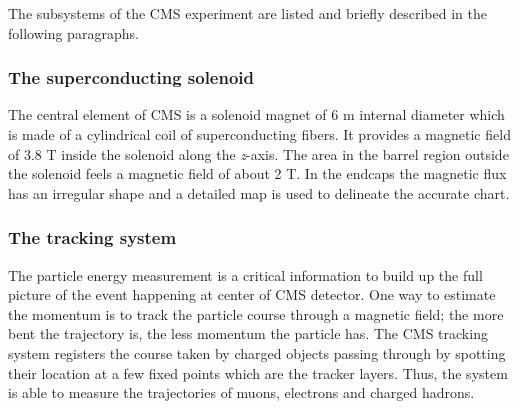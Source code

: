 The subsystems of the CMS experiment are listed and briefly described
in the following paragraphs.

\subsubsection{The superconducting solenoid}
The central element of CMS is a solenoid magnet of 6 m internal diameter
which is made of a cylindrical coil of superconducting fibers. It 
provides a magnetic field of 3.8 T inside the solenoid along the
\emph{z}-axis. The area in the barrel region outside the solenoid
feels a magnetic field of about 2 T.
In the endcaps the
magnetic flux has an irregular shape and a detailed map is used to
delineate the accurate chart.
\subsubsection{The tracking system}\label{sec:tracking}
The particle energy measurement is a critical information to build up the full
picture of the event happening at center of CMS detector. One way to
estimate the momentum is to track the particle course through a
magnetic field; the more bent the trajectory is, the less momentum the
particle has. The CMS tracking system registers the course taken by
charged objects passing through by spotting their location at a few
fixed points which are the tracker layers. 
Thus, the system is able to measure the trajectories of muons,
electrons and
charged hadrons.


